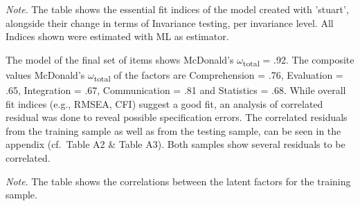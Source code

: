 \documentclass[
  12pt,
  a4paper,
  twoside]{article}
\begin{document}
\begin{table}[htpb]
\caption{Fit Indices for Model and Results of MGCFA testing}

\vspace{10pt}
\small\textit{Note}. The table shows the essential fit indices of the model created with 'stuart', alongside their change in terms of Invariance testing, per invariance level. All Indices shown were estimated with ML as estimator.
\end{table}

The model of the final set of items shows McDonald's \(\omega\)\textsubscript{total} = .92. The composite values McDonald's \(\omega\)\textsubscript{total} of the factors are Comprehension = .76, Evaluation = .65, Integration = .67, Communication = .81 and Statistics = .68.
While overall fit indices (e.g., RMSEA, CFI) suggest a good fit, an analysis of correlated residual was done to reveal possible specification errors.
The correlated residuals from the training sample as well as from the testing sample, can be seen in the appendix (cf.~Table A2 \& Table A3).
Both samples show several residuals to be correlated.

\begin{table}[htpb]
\caption{Latent Factor correlations training sample}


\vspace{10pt}  %
\small\textit{Note}. The table shows the correlations between the latent factors for the training sample.
\end{table}
\end{document}
